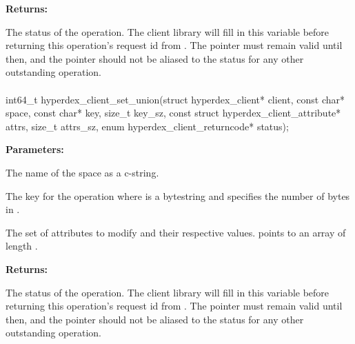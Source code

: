 \noindent\textbf{Returns:}
\begin{description}[labelindent=\widthof{{\code{status}}},leftmargin=*,noitemsep,nolistsep,align=right]
\item[\code{status}] The status of the operation.  The client library will fill in this variable before returning this operation's request id from .  The pointer must remain valid until then, and the pointer should not be aliased to the status for any other outstanding operation.
\end{description}

\paragraph{}
\label{api:c:set_union}
\begin{ccode}
int64_t hyperdex_client_set_union(struct hyperdex_client* client,
        const char* space,
        const char* key, size_t key_sz,
        const struct hyperdex_client_attribute* attrs, size_t attrs_sz,
        enum hyperdex_client_returncode* status);
\end{ccode}
\funcdesc 

\noindent\textbf{Parameters:}
\begin{description}[labelindent=\widthof{{\code{attrs}, \code{attrs\_sz}}},leftmargin=*,noitemsep,nolistsep,align=right]
\item[\code{space}] The name of the space as a c-string.
\item[\code{key}, \code{key\_sz}] The key for the operation where  is a bytestring and  specifies the number of bytes in .
\item[\code{attrs}, \code{attrs\_sz}] The set of attributes to modify and their respective values.   points to an array of length .
\end{description}

\noindent\textbf{Returns:}
\begin{description}[labelindent=\widthof{{\code{status}}},leftmargin=*,noitemsep,nolistsep,align=right]
\item[\code{status}] The status of the operation.  The client library will fill in this variable before returning this operation's request id from .  The pointer must remain valid until then, and the pointer should not be aliased to the status for any other outstanding operation.
\end{description}

